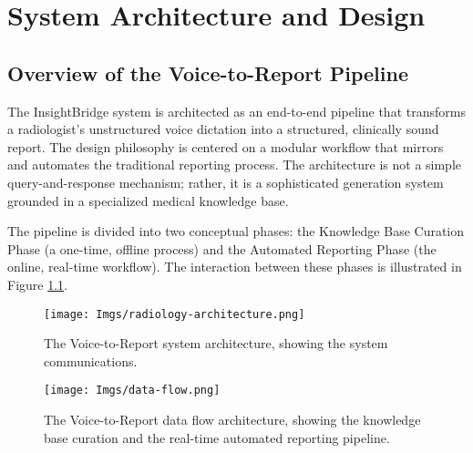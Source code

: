 \chapter{System Architecture and Design}
\label{cha:architecture}

\section{Overview of the Voice-to-Report Pipeline}

The InsightBridge system is architected as an end-to-end pipeline that transforms a radiologist's unstructured voice dictation into a structured, clinically sound report. The design philosophy is centered on a modular workflow that mirrors and automates the traditional reporting process. The architecture is not a simple query-and-response mechanism; rather, it is a sophisticated generation system grounded in a specialized medical knowledge base.

The pipeline is divided into two conceptual phases: the Knowledge Base Curation Phase (a one-time, offline process) and the Automated Reporting Phase (the online, real-time workflow). The interaction between these phases is illustrated in Figure \ref{fig:radiology_architecture}.

\begin{figure}[!htbp]
    \centering
    \texttt{[image: Imgs/radiology-architecture.png]}
    \caption{The Voice-to-Report system architecture, showing the system communications.}
    \label{fig:radiology_architecture}
\end{figure}

\begin{figure}[!htbp]
    \centering
    \texttt{[image: Imgs/data-flow.png]}
    \caption{The Voice-to-Report data flow architecture, showing the knowledge base curation and the real-time automated reporting pipeline.}
    \label{fig:data_flow}
\end{figure}
 \newpage
